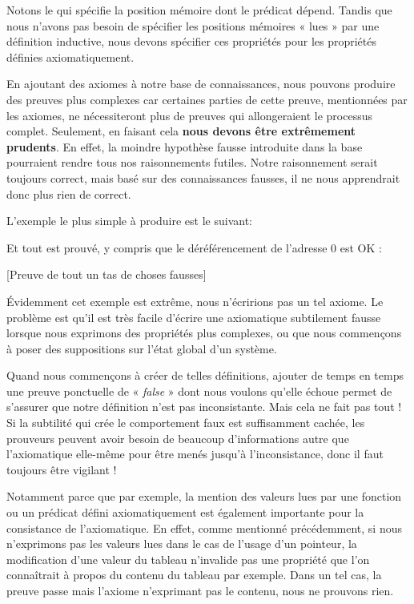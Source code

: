 

Notons le  qui spécifie la position mémoire dont le
prédicat dépend. Tandis que nous n'avons pas besoin de spécifier les positions
mémoires « lues » par une définition inductive, nous devons spécifier ces propriétés
pour les propriétés définies axiomatiquement.




En ajoutant des axiomes à notre base de connaissances, nous pouvons produire des
preuves plus complexes car certaines parties de cette preuve, mentionnées par
les axiomes, ne nécessiteront plus de preuves qui allongeraient le processus
complet. Seulement, en faisant cela \textbf{nous devons être extrêmement prudents}.
En effet, la moindre hypothèse fausse introduite dans la base pourraient rendre
tous nos raisonnements futiles. Notre raisonnement serait toujours correct, mais
basé sur des connaissances fausses, il ne nous apprendrait donc plus rien de correct.



L'exemple le plus simple à produire est le suivant:






Et tout est prouvé, y compris que le déréférencement de l'adresse 0 est OK :



[Preuve de tout un tas de choses fausses]


Évidemment cet exemple est extrême, nous n'écririons pas un tel axiome. Le
problème est qu'il est très facile d'écrire une axiomatique subtilement fausse
lorsque nous exprimons des propriétés plus complexes, ou que nous commençons à
poser des suppositions sur l'état global d'un système.



Quand nous commençons à créer de telles définitions, ajouter de temps en
temps une preuve ponctuelle de « \textit{false} » dont nous voulons qu'elle échoue permet
de s'assurer que notre définition n'est pas inconsistante. Mais cela ne fait pas
tout ! Si la subtilité qui crée le comportement faux est suffisamment cachée, les
prouveurs peuvent avoir besoin de beaucoup d'informations autre que l'axiomatique
elle-même pour être menés jusqu'à l'inconsistance, donc il faut toujours être
vigilant !



Notamment parce que par exemple, la mention des valeurs lues par une fonction
ou un prédicat défini axiomatiquement est également importante pour la
consistance de l'axiomatique. En effet, comme mentionné précédemment, si nous
n'exprimons pas les valeurs lues dans le cas de l'usage d'un pointeur, la
modification d'une valeur du tableau n'invalide pas une propriété que l'on
connaîtrait à propos du contenu du tableau par exemple. Dans un tel cas, la
preuve passe mais l'axiome n'exprimant pas le contenu, nous ne prouvons rien.



